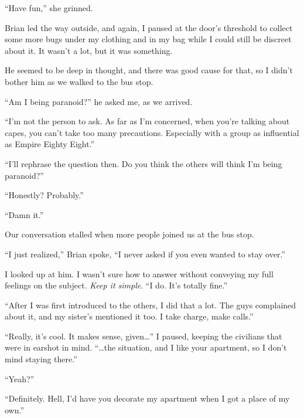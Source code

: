 ``Have fun,'' she grinned.



Brian led the way outside, and again, I paused at the door's threshold to collect some more bugs under my clothing and in my bag while I could still be discreet about it.  It wasn't a lot, but it was something.



He seemed to be deep in thought, and there was good cause for that, so I didn't bother him as we walked to the bus stop.



``Am I being paranoid?'' he asked me, as we arrived.



``I'm not the person to ask.  As far as I'm concerned, when you're talking about capes, you can't take too many precautions.  Especially with a group as influential as Empire Eighty Eight.''



``I'll rephrase the question then.  Do you think the others will think I'm being paranoid?''



``Honestly?  Probably.''



``Damn it.''



Our conversation stalled when more people joined us at the bus stop.



``I just realized,'' Brian spoke, ``I never asked if you even wanted to stay over.''



I looked up at him.  I wasn't sure how to answer without conveying my full feelings on the subject.  \emph{Keep it simple}.  ``I do.  It's totally fine.''



``After I was first introduced to the others, I did that a lot.  The guys complained about it, and my sister's mentioned it too.  I take charge, make calls.''



``Really, it's cool.  It makes sense, given\ldots'' I paused, keeping the civilians that were in earshot in mind.  ``\ldots{}the situation, and I like your apartment, so I don't mind staying there.''



``Yeah?''



``Definitely.  Hell, I'd have you decorate my apartment when I got a place of my own.''



